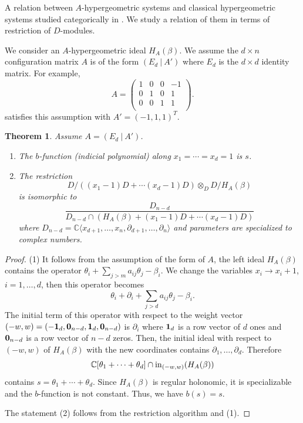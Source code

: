 \documentclass{article}
\def\CC{\mathbb{C}}
\def\pd#1{\partial_{#1}}
\newtheorem{theorem}{Theorem}
\begin{document}
A relation between $A$-hypergeometric systems
and classical hypergeometric systems studied categorically in
\cite{berkesch}.
We study a relation of them in terms of restriction of $D$-modules. 

We consider an $A$-hypergeometric ideal $H_A(\beta)$.
We assume the $d \times n$ configuration matrix $A$ is of the form
$\left( E_d\ \vert\  A' \right)$
where $E_d$ is the $d \times d$ identity matrix.
For example, $$
 A=\left(\begin{array}{ccc|c}
 1 & 0 & 0 &-1 \\
 0 & 1 & 0 & 1 \\
 0 & 0 & 1 & 1 \\
\end{array} \right).
$$
satisfies this assumption with $A'=(-1,1,1)^T$.
\begin{theorem}  \label{th:bf_for_A}
Assume $A=\left( E_d \ \vert \ A' \right)$.
\begin{enumerate}
\item The $b$-function (indicial polynomial) along 
$x_1= \cdots = x_d =1$ is $s$.
\item 
The restriction 
\begin{equation}
 D/((x_1-1)D + \cdots (x_d-1)D) \otimes_{D} D/H_A(\beta) 
\end{equation}
is isomorphic to
$$ \frac{D_{n-d}}{D_{n-d} \cap (H_A(\beta)+(x_1-1)D + \cdots (x_d-1)D)} $$
where $D_{n-d}=\CC\langle x_{d+1}, \ldots, x_n, \pd{d+1}, \ldots, \pd{n}\rangle$
and parameters are specialized to complex numbers.
\end{enumerate}
\end{theorem}

\begin{proof}
(1) 
It follows from the assumption of the form of $A$,
the left ideal $H_A(\beta)$ contains the operator
$\theta_i + \sum_{j > m}  a_{ij} \theta_j - \beta_i$.
We change the variables $x_i \rightarrow x_i+1$, $i=1, \ldots, d$,
then this operator becomes
$$\theta_i + \pd{i} + \sum_{j > d}  a_{ij} \theta_j - \beta_i.
$$
The initial term of this operator
with respect to the weight vector
$(-w,w)=(-{\bf 1}_d,{\bf 0}_{n-d}, {\bf 1}_d, {\bf 0}_{n-d})$
is $\pd{i}$
where ${\bf 1}_d$ is a row vector of $d$ ones and
${\bf 0}_{n-d}$ is a row vector of $n-d$ zeros.
Then, the initial ideal with respect to $(-w,w)$ of $H_A(\beta)$ 
with the new coordinates contains
$\pd{1}, \ldots, \pd{d}$.
Therefore
$$\CC[\theta_1+\cdots +\theta_d] \cap {\rm in}_{(-w,w)} (H_A(\beta))$$
contains $s=\theta_1+\cdots +\theta_d$.
Since $H_A(\beta)$ is regular holonomic,
it is specializable and the $b$-function is not constant.
Thus, we have $b(s)=s$.

The statement (2) follows from the restriction algorithm \cite{oaku-1997} 
and (1).
\end{proof}
\end{document}
